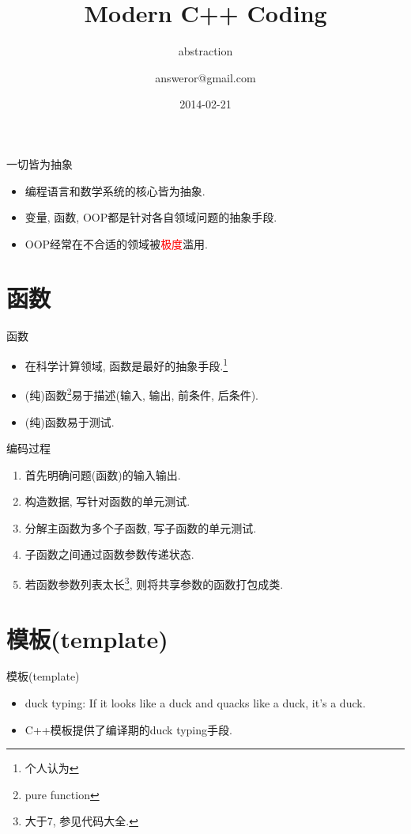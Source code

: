 \documentclass[compress]{beamer}
\title{Modern C++ Coding}
\subtitle{abstraction}
\author{answeror@gmail.com}
\date{2014-02-21}
\begin{document}
\frame{\titlepage}



\begin{frame}{一切皆为抽象}
    \begin{itemize}[<+->]
        \item 编程语言和数学系统的核心皆为抽象.
        \item 变量, 函数, OOP都是针对各自领域问题的抽象手段.
        \item OOP经常在不合适的领域被\textcolor{red}{极度}滥用.
    \end{itemize}
\end{frame}

\section{函数}

\begin{frame}{函数}
    \begin{itemize}[<+->]
        \item 在科学计算领域, 函数是最好的抽象手段.\footnote{个人认为}
        \item (纯)函数\footnote{pure function}易于描述(输入, 输出, 前条件, 后条件).
        \item (纯)函数易于测试.
    \end{itemize}
\end{frame}

\begin{frame}{编码过程}
    \begin{enumerate}[<+->]
        \item 首先明确问题(函数)的输入输出.
        \item 构造数据, 写针对函数的单元测试.
        \item 分解主函数为多个子函数, 写子函数的单元测试.
        \item 子函数之间通过函数参数传递状态.
        \item 若函数参数列表太长\footnote{大于7, 参见代码大全.}, 则将共享参数的函数打包成类.
    \end{enumerate}
\end{frame}

\section{模板(template)}

\begin{frame}{模板(template)}
    \begin{itemize}[<+->]
        \item duck typing: If it looks like a duck and quacks like a duck, it's a duck.
        \item C++模板提供了编译期的duck typing手段.
    \end{itemize}
\end{frame}
\end{document}
